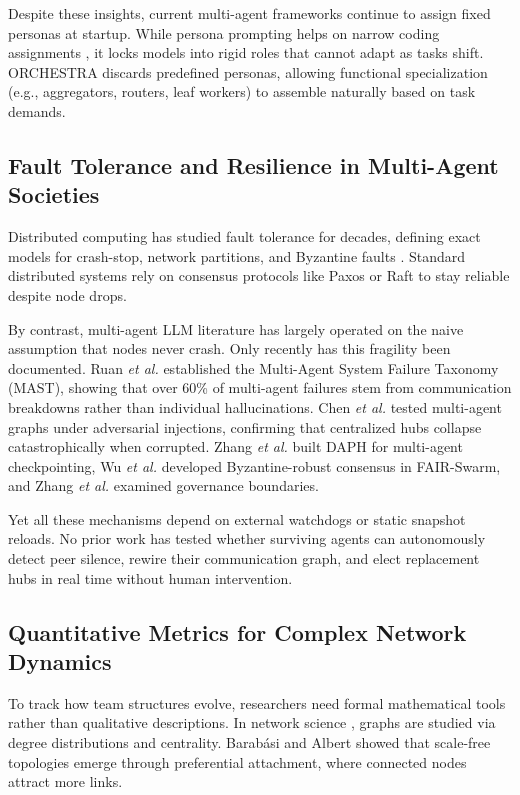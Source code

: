 \documentclass{ieeeaccess}
\begin{document}
Despite these insights, current multi-agent frameworks continue to assign fixed personas at startup. While persona prompting helps on narrow coding assignments \cite{hong2024metagpt, qian2024chatdev}, it locks models into rigid roles that cannot adapt as tasks shift. ORCHESTRA discards predefined personas, allowing functional specialization (e.g., aggregators, routers, leaf workers) to assemble naturally based on task demands.

\subsection{Fault Tolerance and Resilience in Multi-Agent Societies}
Distributed computing has studied fault tolerance for decades, defining exact models for crash-stop, network partitions, and Byzantine faults \cite{lamport1982byzantine, lynch1996distributed, chandy1985distributed}. Standard distributed systems rely on consensus protocols like Paxos or Raft to stay reliable despite node drops.

By contrast, multi-agent LLM literature has largely operated on the naive assumption that nodes never crash. Only recently has this fragility been documented. Ruan \emph{et al.} \cite{ruan2025mast} established the Multi-Agent System Failure Taxonomy (MAST), showing that over 60\% of multi-agent failures stem from communication breakdowns rather than individual hallucinations. Chen \emph{et al.} \cite{chen2025resilience} tested multi-agent graphs under adversarial injections, confirming that centralized hubs collapse catastrophically when corrupted. Zhang \emph{et al.} \cite{zhang2025daph} built DAPH for multi-agent checkpointing, Wu \emph{et al.} \cite{wu2025fairswarm} developed Byzantine-robust consensus in FAIR-Swarm, and Zhang \emph{et al.} \cite{zhang2025governance} examined governance boundaries.

Yet all these mechanisms depend on external watchdogs or static snapshot reloads. No prior work has tested whether surviving agents can autonomously detect peer silence, rewire their communication graph, and elect replacement hubs in real time without human intervention.

\subsection{Quantitative Metrics for Complex Network Dynamics}
To track how team structures evolve, researchers need formal mathematical tools rather than qualitative descriptions. In network science \cite{holme2012temporal, watts1998collective, barabasi1999emergence}, graphs are studied via degree distributions and centrality. Barab{\'a}si and Albert \cite{barabasi1999emergence} showed that scale-free topologies emerge through preferential attachment, where connected nodes attract more links.
\end{document}
